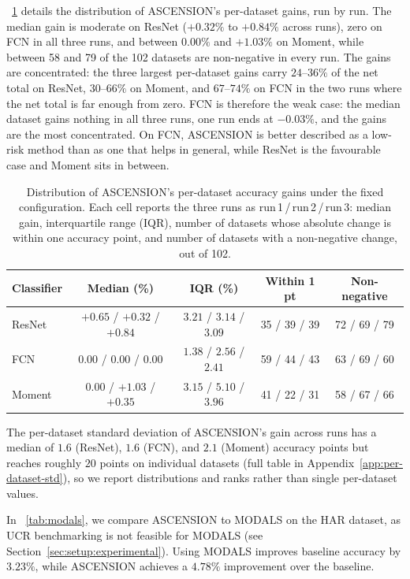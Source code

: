 \tablename~\ref{tab:gain-distribution} details the distribution of
ASCENSION's per-dataset gains, run by run. The median gain is
moderate on ResNet ($+0.32\%$ to $+0.84\%$ across runs), zero on FCN
in all three runs, and between $0.00\%$ and $+1.03\%$ on Moment,
while between 58 and 79 of the 102 datasets are non-negative in
every run. The gains are concentrated: the three largest per-dataset
gains carry $24$--$36\%$ of the net total on ResNet, $30$--$66\%$ on
Moment, and $67$--$74\%$ on FCN in the two runs where the net total
is far enough from zero. FCN is therefore the weak case: the median
dataset gains nothing in all three runs, one run ends at $-0.03\%$,
and the gains are the most concentrated. On FCN, ASCENSION is better
described as a low-risk method than as one that helps in general,
while ResNet is the favourable case and Moment sits in between.

\begin{table}[t]
\centering
\small
\caption{Distribution of ASCENSION's per-dataset accuracy gains under
the fixed configuration. Each cell reports the three runs as
run\,1\,/\,run\,2\,/\,run\,3: median gain, interquartile range
(IQR), number of datasets whose absolute change is within one accuracy
point, and number of datasets with a non-negative change, out of 102.}
\label{tab:gain-distribution}
\begin{tabular}{@{}lcccc@{}}
\toprule
\textbf{Classifier} & \textbf{Median (\%)} & \textbf{IQR (\%)}
  & \textbf{Within 1 pt} & \textbf{Non-negative} \\
\midrule
ResNet & $+0.65$ / $+0.32$ / $+0.84$ & $3.21$ / $3.14$ / $3.09$ & 35 / 39 / 39 & 72 / 69 / 79 \\
FCN    & $0.00$ / $0.00$ / $0.00$    & $1.38$ / $2.56$ / $2.41$ & 59 / 44 / 43 & 63 / 69 / 60 \\
Moment & $0.00$ / $+1.03$ / $+0.35$  & $3.15$ / $5.10$ / $3.96$ & 41 / 22 / 31 & 58 / 67 / 66 \\
\bottomrule
\end{tabular}
\end{table}

The per-dataset standard deviation of ASCENSION's gain across runs
has a median of $1.6$ (ResNet), $1.6$ (FCN), and $2.1$ (Moment)
accuracy points but reaches roughly $20$ points on individual
datasets (full table in Appendix~\ref{app:per-dataset-std}), so we
report distributions and ranks rather than single per-dataset
values.


In \tablename~\ref{tab:modals}, we compare ASCENSION to MODALS on the
HAR dataset, as UCR benchmarking is not feasible for MODALS (see
Section~\ref{sec:setup:experimental}). Using MODALS improves
baseline accuracy by $3.23\%$, while ASCENSION achieves a $4.78\%$
improvement over the baseline. 

